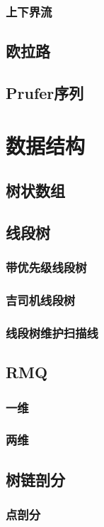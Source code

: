 \documentclass[twocolumn,a4]{article}
\newcommand{\addcpp}[1]{}
\begin{document}
		\subsubsection{上下界流}
	\subsection{欧拉路}
	\subsection{Prufer序列}

\section{数据结构}
	\subsection{树状数组}
	\subsection{线段树}
		\subsubsection{带优先级线段树}
		\subsubsection{吉司机线段树}
			\addcpp{datastruct/minSeg}
		\subsubsection{线段树维护扫描线}
	\subsection{RMQ}
		\subsubsection{一维}
		\subsubsection{两维}
	\subsection{树链剖分}
		\subsubsection{点剖分}
			\addcpp{datastruct/heavy_light_decomposition}
\end{document}
